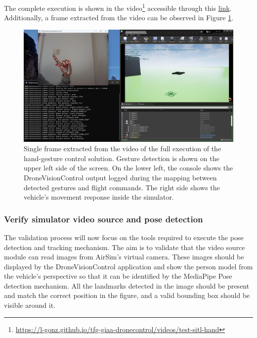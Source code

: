 The complete execution is shown in the video\footnote{\url{https://l-gonz.github.io/tfg-giaa-dronecontrol/videos/test-sitl-hand}} accessible through this \href{https://l-gonz.github.io/tfg-giaa-dronecontrol/videos/test-sitl-hand}{link}. Additionally, a frame extracted from the video can be observed in Figure \ref{fig:sitl-hand-video}.

\begin{figure}
  \centering
  \includegraphics[width=\textwidth, keepaspectratio]{img/video-hand-sitl.png}
  \caption{Single frame extracted from the video of the full execution of the hand-gesture control solution. Gesture detection is shown on the upper left side of the screen. On the lower left, the console shows the DroneVisionControl output logged during the mapping between detected gestures and flight commands. The right side shows the vehicle's movement response inside the simulator.}
  \label{fig:sitl-hand-video}
\end{figure}

\subsubsection{Verify simulator video source and pose detection}

The validation process will now focus on the tools required to execute the pose detection and tracking mechanism. The aim is to validate that the video source module can read images from AirSim's virtual camera. These images should be displayed by the DroneVisionControl application and show the person model from the vehicle's perspective so that it can be identified by the MediaPipe Pose detection mechanism. All the landmarks detected in the image should be present and match the correct position in the figure, and a valid bounding box should be visible around it.

